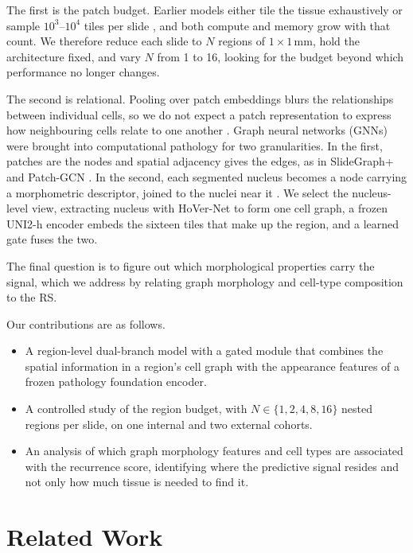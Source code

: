 \documentclass{midl} %
\begin{document}
The first is the patch budget. Earlier
models either tile the tissue exhaustively \citep{campanella2019, lu2021} or sample
$10^3$--$10^4$ tiles per slide \citep{courtiol2018, wulczyn2020}, and both compute and memory
grow with that count. We therefore reduce each slide to $N$ regions of $1 \times 1$\,mm, hold
the architecture fixed, and vary $N$ from 1 to 16, looking for the budget beyond which
performance no longer changes. 

The second is relational. Pooling over patch embeddings blurs the relationships between
individual cells, so we do not expect a patch representation to express how neighbouring cells
relate to one another \citep{ilse2018, pati2022}. Graph neural networks (GNNs) were brought
into computational pathology for two
granularities. In the first, patches are the nodes and spatial adjacency gives the edges, as in
SlideGraph+ \citep{lu2022} and Patch-GCN \citep{chen2021}. In the second, each segmented
nucleus becomes a node carrying a morphometric descriptor, joined to the nuclei near it
\citep{gunduz2004, zhou2019, pati2022}. We select the nucleus-level view, extracting nucleus with
HoVer-Net \citep{graham2019} to form one cell graph, a frozen UNI2-h encoder embeds the
sixteen tiles that make up the region, and a learned gate fuses the two.

The final question is to figure out which morphological properties carry the signal, which we
address by relating graph morphology and cell-type composition to the RS.

Our contributions are as follows.
\begin{itemize}
\item A region-level dual-branch model with a gated module that combines the spatial
  information in a region's cell graph with the appearance features of a frozen pathology
  foundation encoder.
\item A controlled study of the region budget, with $N \in \{1,2,4,8,16\}$ nested regions per
  slide, on one internal and two external cohorts.
\item An analysis of which graph morphology features and cell types are associated with the
  recurrence score, identifying where the predictive signal resides and not only how much
  tissue is needed to find it.
\end{itemize}
\section{Related Work}
\label{sec:related-work}
\end{document}
